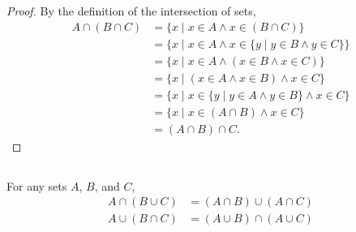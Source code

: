 \documentclass{report}
\begin{document}
\begin{proof}
    By the definition of the intersection of sets,
      \begin{align*}
        A \cap (B \cap C)
          & = \{ x \mid x \in A \land x \in (B \cap C) \} \\
          & = \{ x \mid x \in A \land
                        x \in \{ y \mid y \in B \land y \in C \}\} \\
          & = \{ x \mid x \in A \land (x \in B \land x \in C) \} \\
          & = \{ x \mid (x \in A \land x \in B) \land x \in C \} \\
          & = \{ x \mid x \in \{ y \mid y \in A \land y \in B \} \land
                        x \in C \} \\
          & = \{ x \mid x \in (A \cap B) \land x \in C \} \\
          & = (A \cap B) \cap C.
      \end{align*}

\end{proof}

\subsection{}%
\label{sub:distributive-laws}

For any sets $A$, $B$, and $C$,
  \begin{align*}
    A \cap (B \cup C) & = (A \cap B) \cup (A \cap C) \\
    A \cup (B \cap C) & = (A \cup B) \cap (A \cup C)
  \end{align*}
\end{document}
